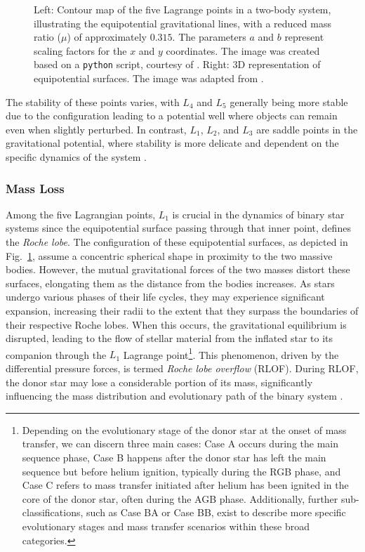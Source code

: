 \documentclass[main.tex]{subfiles}
\begin{document}
\begin{figure}[t!]
\begin{subfigure}{0.535\textwidth}
         \end{subfigure}
         \caption{Left: Contour map of the five Lagrange points in a two-body system, illustrating the equipotential gravitational lines, with a reduced mass ratio ($\mu$) of approximately $0.315$. The parameters $a$ and $b$ represent scaling factors for the $x$ and $y$ coordinates. The image was created based on a \texttt{python} script, courtesy of \cite{Zingale}.
         Right: 3D representation of equipotential surfaces. The image was adapted from \cite{Sluijs}.}
         \label{fig:eq_sur}
    \end{figure}

    The stability of these points varies, with $L_4$ and $L_5$ generally being more stable due to the configuration leading to a potential well where objects can remain even when slightly perturbed. In contrast, $L_1$, $L_2$, and $L_3$ are saddle points in the gravitational potential, where stability is more delicate and dependent on the specific dynamics of the system \citep[e.g.,][]{Szebehely, Celletti1990, Schwarz2012}. 

    \subsubsection{Mass Loss}
    Among the five Lagrangian points, $L_1$ is crucial in the dynamics of binary star systems since the equipotential surface passing through that inner point, defines the \textit{Roche lobe}. The configuration of these equipotential surfaces, as depicted in Fig.~\ref{fig:eq_sur}, assume a concentric spherical shape in proximity to the two massive bodies. However, the mutual gravitational forces of the two masses distort these surfaces, elongating them as the distance from the bodies increases. As stars undergo various phases of their life cycles, they may experience significant expansion, increasing their radii to the extent that they surpass the boundaries of their respective Roche lobes. When this occurs, the gravitational equilibrium is disrupted, leading to the flow of stellar material from the inflated star to its companion through the $L_1$ Lagrange point\footnote{Depending on the evolutionary stage of the donor star at the onset of mass transfer, we can discern three main cases: Case A occurs during the main sequence phase, Case B happens after the donor star has left the main sequence but before helium ignition, typically during the RGB phase, and Case C refers to mass transfer initiated after helium has been ignited in the core of the donor star, often during the AGB phase. Additionally, further sub-classifications, such as Case BA or Case BB, exist to describe more specific evolutionary stages and mass transfer scenarios within these broad categories.}. This phenomenon, driven by the differential pressure forces, is termed \textit{Roche lobe overflow} (RLOF). During RLOF, the donor star may lose a considerable portion of its mass, significantly influencing the mass distribution and evolutionary path of the binary system \citep[e.g.,][]{temmink:aa23}.
\end{document}
